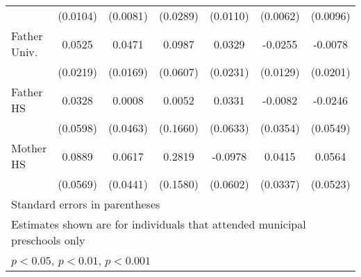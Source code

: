 \begin{table}[htbp]
\begin{tabular}{l*{6}{c}}
            &    (0.0104)         &    (0.0081)         &    (0.0289)         &    (0.0110)         &    (0.0062)         &    (0.0096)         \\
\addlinespace
Father Univ.&      0.0525\sym{*}  &      0.0471\sym{**} &      0.0987         &      0.0329         &     -0.0255\sym{*}  &     -0.0078         \\
            &    (0.0219)         &    (0.0169)         &    (0.0607)         &    (0.0231)         &    (0.0129)         &    (0.0201)         \\
\addlinespace
Father HS   &      0.0328         &      0.0008         &      0.0052         &      0.0331         &     -0.0082         &     -0.0246         \\
            &    (0.0598)         &    (0.0463)         &    (0.1660)         &    (0.0633)         &    (0.0354)         &    (0.0549)         \\
\addlinespace
Mother HS   &      0.0889         &      0.0617         &      0.2819         &     -0.0978         &      0.0415         &      0.0564         \\
            &    (0.0569)         &    (0.0441)         &    (0.1580)         &    (0.0602)         &    (0.0337)         &    (0.0523)         \\
\bottomrule
\multicolumn{7}{l}{\footnotesize Standard errors in parentheses}\\
\multicolumn{7}{l}{\footnotesize Estimates shown are for individuals that attended municipal preschools only}\\
\multicolumn{7}{l}{\footnotesize \sym{*} \(p<0.05\), \sym{**} \(p<0.01\), \sym{***} \(p<0.001\)}\\
\end{tabular}
\end{table}

